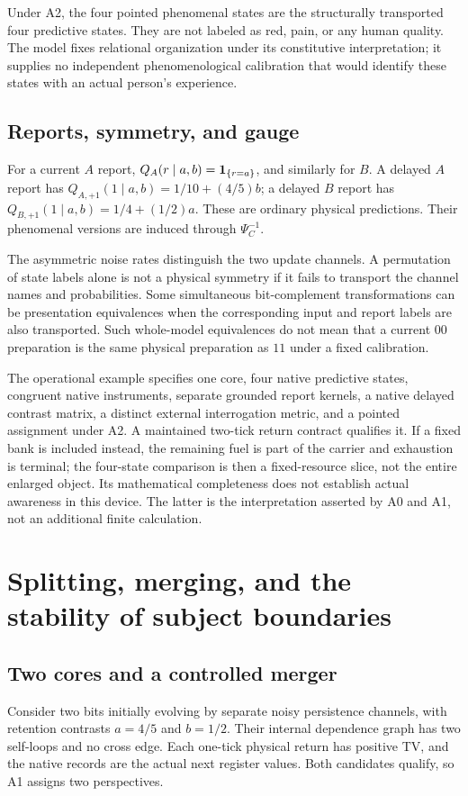 Under A2, the four pointed phenomenal states are the structurally transported four predictive states. They are not labeled as red, pain, or any human quality. The model fixes relational organization under its constitutive interpretation; it supplies no independent phenomenological calibration that would identify these states with an actual person's experience.

\section{Reports, symmetry, and gauge}\label{section:worked:reports-symmetry-and-gauge}
For a current $A$ report, $Q_A(r\mid a,b)=\mathbf 1_{\{r=a\}}$, and similarly for $B$. A delayed $A$ report has $Q_{A,+1}(1\mid a,b)=1/10+(4/5)b$; a delayed $B$ report has $Q_{B,+1}(1\mid a,b)=1/4+(1/2)a$. These are ordinary physical predictions. Their phenomenal versions are induced through $\Psi_C^{-1}$.

The asymmetric noise rates distinguish the two update channels. A permutation of state labels alone is not a physical symmetry if it fails to transport the channel names and probabilities. Some simultaneous bit-complement transformations can be presentation equivalences when the corresponding input and report labels are also transported. Such whole-model equivalences do not mean that a current $00$ preparation is the same physical preparation as $11$ under a fixed calibration.

The operational example specifies one core, four native predictive states, congruent native instruments, separate grounded report kernels, a native delayed contrast matrix, a distinct external interrogation metric, and a pointed assignment under A2. A maintained two-tick return contract qualifies it. If a fixed bank is included instead, the remaining fuel is part of the carrier and exhaustion is terminal; the four-state comparison is then a fixed-resource slice, not the entire enlarged object. Its mathematical completeness does not establish actual awareness in this device. The latter is the interpretation asserted by A0 and A1, not an additional finite calculation.

\chapter{Splitting, merging, and the stability of subject boundaries}\label{ch:split}
\section{Two cores and a controlled merger}\label{section:split:two-cores-and-a-controlled-merger}
Consider two bits initially evolving by separate noisy persistence channels, with retention contrasts $a=4/5$ and $b=1/2$. Their internal dependence graph has two self-loops and no cross edge. Each one-tick physical return has positive TV, and the native records are the actual next register values. Both candidates qualify, so A1 assigns two perspectives.

